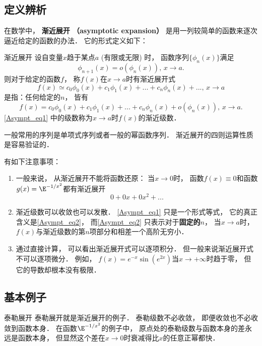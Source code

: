 

\subsection{定义辨析}
在数学中， \textbf{渐近展开 （asymptotic expansion）} 是用一列较简单的函数来逐次逼近给定的函数的办法． 它的形式定义如下：

\begin{definition}{渐近展开}
设自变量$x$趋于某点$a$ (有限或无限) 时， 函数序列$\{\phi_{n}(x)\}$满足
$$
\phi_{n+1}(x)=o(\phi_n(x)),\,x\to a.
$$
则对于给定的函数$f$， 称$f(x)$在$x\to a$时有渐近展开式
\begin{equation}\label{Asympt_eq1}
f(x)\simeq c_0\phi_0(x)+c_1\phi_1(x)+...+c_n\phi_n(x)+...,\,x\to a
\end{equation}
是指：任何给定的$n$， 皆有
\begin{equation}\label{Asympt_eq2}
f(x)=c_0\phi_0(x)+c_1\phi_1(x)+...+c_n\phi_n(x)+o(\phi_n(x)),\,x\to a.
\end{equation}
\autoref{Asympt_eq1} 中的级数称为$x\to a$时$f(x)$的渐近级数．
\end{definition}

一般常用的序列是单项式序列或者一般的幂函数序列． 渐近展开的四则运算性质是容易验证的．

有如下注意事项：
\begin{enumerate}
\item 一般来说， 从渐近展开不能将函数还原： 当$x\to0$时， 函数$f(x)\equiv 0$和函数$g(x)=\E^{-1/x^2}$都有渐近展开
$$
0+0x+0x^2+...
$$

\item 渐近级数可以收敛也可以发散． \autoref{Asympt_eq1} 只是一个形式等式， 它的真正含义是\autoref{Asympt_eq2}，  而\autoref{Asympt_eq2} 只表示对于\textbf{固定的$n$}， 当$x\to a$时， $f(x)$与渐近级数的第$n$项部分和相差一个高阶无穷小． 

\item 通过直接计算， 可以看出渐近展开式可以逐项积分． 但一般来说渐近展开式不可以逐项微分． 例如， $f(x)=e^{-x}\sin(e^{2x})$当$x\to+\infty$时趋于零， 但它的导数却根本没有极限．
\end{enumerate}

\subsection{基本例子}
\begin{example}{泰勒展开}
泰勒展开就是渐近展开的例子． 泰勒级数不必收敛， 即便收敛也不必收敛到函数本身． 在函数$\E^{-1/x^2}$的例子中， 原点处的泰勒级数与函数本身的差永远是函数本身， 但显然这个差在$x\to0$时衰减得比$x$的任意正幂都快．
\end{example}

